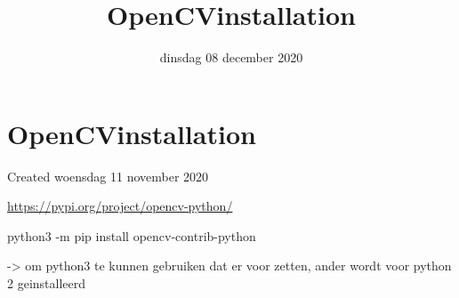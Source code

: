 \documentclass{scrartcl}
\title{OpenCVinstallation}
\date{dinsdag 08 december 2020}
\author{}
\begin{document}
\maketitle

		\section{OpenCVinstallation}

Created woensdag 11 november 2020



\href{https://pypi.org/project/opencv-python/}{https://pypi.org/project/opencv-python/}



python3 -m pip install opencv-contrib-python



-\textgreater{} om python3 te kunnen gebruiken dat er voor zetten, ander wordt voor python 2 geinstalleerd
\end{document}
